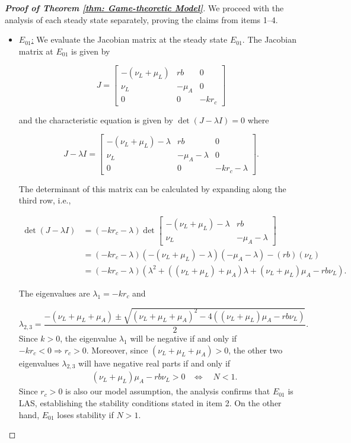 \documentclass[10pt,a4paper]{amsart}
\begin{document}
\begin{proof}[\textbf{Proof of Theorem \ref{thm: Game-theoretic Model}}]

 We proceed with the analysis of each steady state separately, proving the claims from items 1--4. 

 
\begin{itemize}


\item \underline{$E_{01}$:} We evaluate the Jacobian matrix at the steady state $E_{01}$. The Jacobian matrix at $E_{01}$ is given by

\[
J = \begin{bmatrix}
- (\nu_L + \mu_L) & r b & 0 \\
\nu_L & -\mu_A & 0 \\
0 & 0 & -k r_c
\end{bmatrix}
\]

and the characteristic equation is given by \(\det(J - \lambda I) = 0\) where 

\[
J - \lambda I = \begin{bmatrix}
- (\nu_L + \mu_L) - \lambda & r b & 0 \\
\nu_L & -\mu_A - \lambda & 0 \\
0 & 0 & -k r_c - \lambda
\end{bmatrix}.
\]

The determinant of this matrix can be calculated by expanding along the third row, i.e.,

$$ 
\begin{aligned}
\operatorname{det}(J-\lambda I) & =(-k r_c-\lambda)  \operatorname{det}\left[\begin{array}{cc}
-\left(\nu_L+\mu_L\right)-\lambda & r b \\
\nu_L & -\mu_A-\lambda
\end{array}\right] \\
& =(-k r_c-\lambda)\left(-\left(\nu_L+\mu_L\right)-\lambda\right)\left(-\mu_A-\lambda\right)-(r b)\left(\nu_L\right) \\
& =(-k r_c-\lambda)\left(\lambda^2+\left(\left(\nu_L+\mu_L\right)+\mu_A\right) \lambda+\left(\nu_L+\mu_L\right) \mu_A-r b \nu_L\right).
\end{aligned}
$$


The eigenvalues are \(\lambda_1 = -k r_c\) and 

$$
\lambda_{2,3} = \frac{-\left(\nu_L + \mu_L + \mu_A\right) \pm \sqrt{\left(\nu_L + \mu_L + \mu_A\right)^2 - 4\left((\nu_L + \mu_L) \mu_A - r b \nu_L\right)}}{2}.
$$
Since $k>0$, the eigenvalue \(\lambda_1\) will be negative if and only if \(-k r_c < 0 \Rightarrow r_c > 0\). Moreover, since  $(\nu_L + \mu_L + \mu_A) > 0 $,  the other two eigenvalues \(\lambda_{2,3}\) will have negative real parts if and only if
$$
\begin{aligned}
& \left(\nu_L+\mu_L\right) \mu_A-r b \nu_L>0 
& \Leftrightarrow\quad {N}<1.
\end{aligned}
$$
Since $r_c > 0$ is also our model assumption, the analysis confirms that $E_{01}$ is LAS, establishing the stability conditions stated in item 2. On the other hand, $E_{01}$ loses stability if $N>1$.



\end{itemize}
\end{proof}
\end{document}
